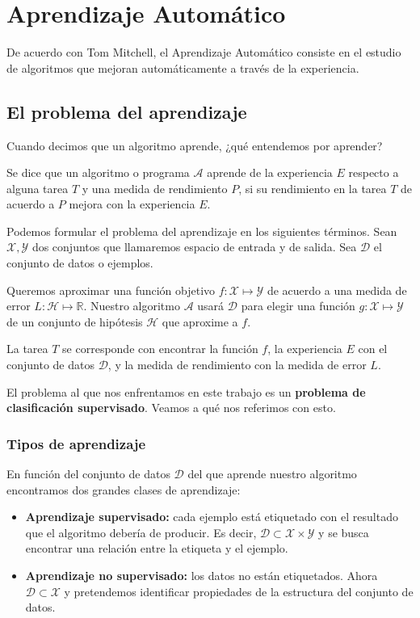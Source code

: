 \chapter{\label{ch3}Aprendizaje Automático}

De acuerdo con Tom Mitchell, el Aprendizaje Automático consiste en el estudio de algoritmos que mejoran automáticamente a través de la experiencia. 

\section{El problema del aprendizaje}

Cuando decimos que un algoritmo aprende, ¿qué entendemos por aprender? 

\begin{definition*}
	Se dice que un algoritmo o programa $\mathcal{A}$ aprende de la experiencia $E$ respecto a alguna tarea $T$ y una medida de rendimiento $P$, si su rendimiento en la tarea $T$ de acuerdo a $P$ mejora con la experiencia $E$.
\end{definition*}

Podemos formular el problema del aprendizaje en los siguientes términos. Sean $\mathcal{X, Y}$ dos conjuntos que llamaremos espacio de entrada y de salida. Sea $\mathcal{D}$ el conjunto de datos o ejemplos.

Queremos aproximar una función objetivo $f: \mathcal{X} \mapsto \mathcal{Y}$ de acuerdo a una medida de error $L: \mathcal{H} \mapsto \mathbb{R}$. Nuestro algoritmo $\mathcal{A}$ usará $\mathcal{D}$ para elegir una función $g: \mathcal{X} \mapsto \mathcal{Y}$ de un conjunto de hipótesis $\mathcal{H}$ que aproxime a $f$.

La tarea $T$ se corresponde con encontrar la función $f$, la experiencia $E$ con el conjunto de datos $\mathcal{D}$, y la medida de rendimiento con la medida de error $L$.

El problema al que nos enfrentamos en este trabajo es un \textbf{problema de clasificación supervisado}. Veamos a qué nos referimos con esto. 

\subsection{Tipos de aprendizaje}
En función del conjunto de datos $\mathcal{D}$ del que aprende nuestro algoritmo encontramos dos grandes clases de aprendizaje:
\begin{itemize}
	\item \textbf{Aprendizaje supervisado:} cada ejemplo está etiquetado con el resultado que el algoritmo debería de producir. Es decir, $\mathcal{D}\subset\mathcal{X}\times\mathcal{Y}$ y se busca encontrar una relación entre la etiqueta y el ejemplo. 
	\item \textbf{Aprendizaje no supervisado:} los datos no están etiquetados. Ahora $\mathcal{D}\subset\mathcal{X}$ y pretendemos identificar propiedades de la estructura del conjunto de datos. 
\end{itemize}

